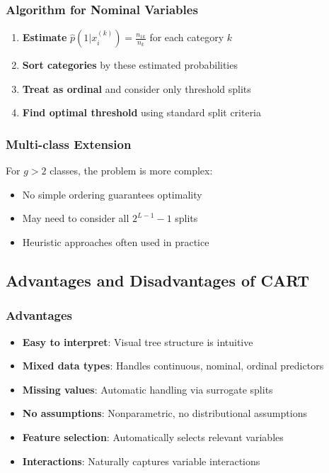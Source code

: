 \documentclass[12pt,a4paper]{article}
\begin{document}
\subsubsection{Algorithm for Nominal Variables}

\begin{enumerate}
    \item \textbf{Estimate} $\hat{p}(1|x_i^{(k)}) = \frac{n_{1k}}{n_k}$ for each category $k$
    \item \textbf{Sort categories} by these estimated probabilities
    \item \textbf{Treat as ordinal} and consider only threshold splits
    \item \textbf{Find optimal threshold} using standard split criteria
\end{enumerate}

\subsubsection{Multi-class Extension}

For $g > 2$ classes, the problem is more complex:
\begin{itemize}
    \item No simple ordering guarantees optimality
    \item May need to consider all $2^{L-1} - 1$ splits
    \item Heuristic approaches often used in practice
\end{itemize}

\subsection{Advantages and Disadvantages of CART}

\subsubsection{Advantages}

\begin{itemize}
    \item \textbf{Easy to interpret}: Visual tree structure is intuitive
    \item \textbf{Mixed data types}: Handles continuous, nominal, ordinal predictors
    \item \textbf{Missing values}: Automatic handling via surrogate splits
    \item \textbf{No assumptions}: Nonparametric, no distributional assumptions
    \item \textbf{Feature selection}: Automatically selects relevant variables
    \item \textbf{Interactions}: Naturally captures variable interactions
\end{itemize}
\end{document}
